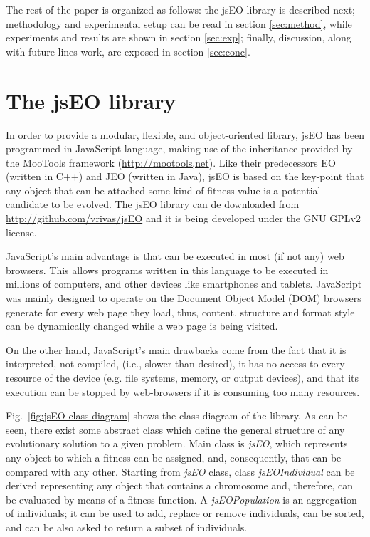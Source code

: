 \documentclass[runningheads,a4paper]{llncs}
\begin{document}
The rest of the paper is organized as follows: the jsEO library is described next;  methodology and experimental setup can be read  in section \ref{sec:method}, while experiments and results are shown in section 
\ref{sec:exp}; finally, discussion, along with future lines work, are exposed in section \ref{sec:conc}.

\section{The jsEO library}
\label{sec:jseo}
In order to provide a modular, flexible, and object-oriented library, jsEO has been programmed in JavaScript language, making use of the inheritance provided by the MooTools framework (\url{http://mootools,net}). Like their predecessors EO (written in C++) and JEO (written in Java), jsEO is based on the key-point that any object that can be attached some kind of fitness value is a potential candidate to be evolved. The jsEO library can de downloaded from \url{http://github.com/vrivas/jsEO} and it is being developed under the GNU GPLv2 license.

JavaScript's main advantage is that can be executed in most (if not any) web browsers. This allows programs written in this language to be executed in millions of computers, and other devices like smartphones and tablets. JavaScript was mainly designed to operate on the Document Object Model (DOM) browsers generate for every web page they load, thus, content, structure and format style can be dynamically changed while a web page is being visited.

On the other hand, JavaScript's main drawbacks come from the fact that it is interpreted, not compiled, (i.e., slower than desired), it has no access to every resource of the device (e.g. file systems,  memory, or output devices), and that its execution can be stopped by web-browsers if it is consuming too many resources.

Fig.~\ref{fig:jsEO-class-diagram} shows the class diagram of the library. As can be seen, there exist some abstract class which define the general structure of any evolutionary solution to a given problem. Main class is \textit{jsEO}, which represents any object to which a fitness can be assigned, and, consequently, that can be compared with any other. Starting from \textit{jsEO} class, class \textit{jsEOIndividual} can be derived representing any object that contains a chromosome and, therefore, can be evaluated by means of a fitness function. A \textit{jsEOPopulation} is an aggregation of individuals; it can be used to add, replace or remove individuals, can be sorted, and can be also asked to return a subset of individuals.
\end{document}
